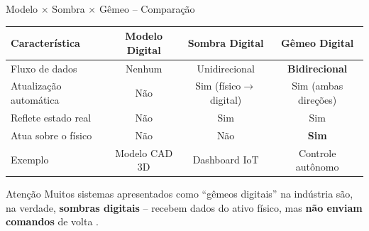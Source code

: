 \documentclass[aspectratio=169,xcolor=dvipsnames]{beamer}
\begin{document}
\begin{frame}{Modelo $\times$ Sombra $\times$ Gêmeo -- Comparação}
    \vspace{0.3em}
    \centering
    \footnotesize
    \begin{tabular}{l c c c}
        \toprule
        \textbf{Característica} & \textbf{Modelo Digital} & \textbf{Sombra Digital} & \textbf{Gêmeo Digital} \\
        \midrule
        Fluxo de dados      & Nenhum           & Unidirecional          & \textbf{Bidirecional} \\
        Atualização automática & Não             & Sim (físico$\to$digital) & Sim (ambas direções)  \\
        Reflete estado real  & Não              & Sim                    & Sim \\
        Atua sobre o físico  & Não              & Não                    & \textbf{Sim} \\
        Exemplo              & Modelo CAD 3D    & Dashboard IoT          & Controle autônomo \\
        \bottomrule
    \end{tabular}

    \vspace{0.8em}
    \begin{alertblock}{Atenção}
        Muitos sistemas apresentados como ``gêmeos digitais'' na indústria são, na verdade, \textbf{sombras digitais} -- recebem dados do ativo físico, mas \textbf{não enviam comandos} de volta \cite{fuller2020dt}.
    \end{alertblock}
\end{frame}
\end{document}
